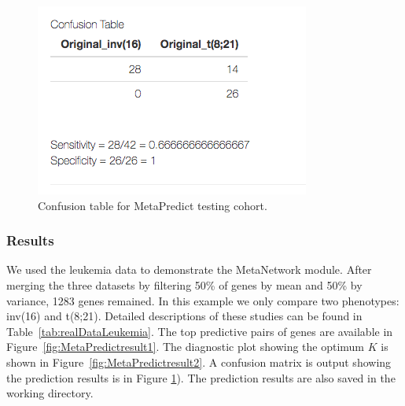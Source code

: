 \begin{figure}[H]
\begin{center}
\includegraphics[scale=0.5]{./figure/MetaPredict/MetaPredictresult3.png}
\caption{Confusion table for MetaPredict testing cohort.}
\label{fig:MetaPredictresult3}
\end{center}
\end{figure}

\subsubsection{Results}

We used the leukemia data to demonstrate the MetaNetwork module.
After merging the three datasets by filtering 50\% of genes by mean and 50\% by variance, 1283 genes remained.
In this example we only compare two phenotypes: inv(16) and t(8;21). 
Detailed descriptions of these studies can be found in Table~\ref{tab:realDataLeukemia}. 
The top predictive pairs of genes are available in Figure~\ref{fig:MetaPredictresult1}.
The diagnostic plot showing the optimum $K$ is shown in Figure~\ref{fig:MetaPredictresult2}.
A confusion matrix is output  showing the prediction results is in Figure \ref{fig:MetaPredictresult3}).
The prediction results are also saved in the working directory.

